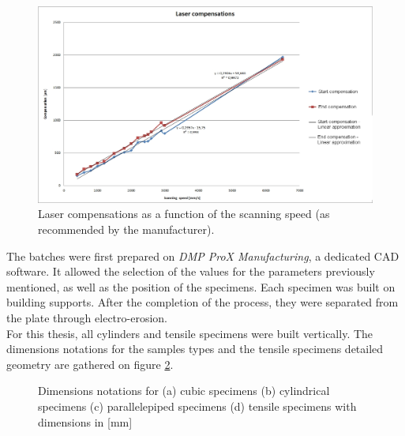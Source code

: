 \begin{figure}[ht]
\centering
\includegraphics[scale=0.45]{Images/Compens1}
\decoRule
\caption[Laser compensations as a function of the scanning speed (as recommended by the manufacturer)]{Laser compensations as a function of the scanning speed (as recommended by the manufacturer).}
\label{fig:Compens1}
\end{figure}

The batches were first prepared on \textit{DMP ProX Manufacturing}, a dedicated CAD software. It allowed the selection of the values for the parameters previously mentioned, as well as the position of the specimens. Each specimen was built on building supports. After the completion of the process, they were separated from the plate through electro-erosion. \\

For this thesis, all cylinders and tensile specimens were built vertically. The dimensions notations for the samples types and the tensile specimens detailed geometry are gathered on figure \ref{fig:cc}.\\

\begin{figure}[ht]
\centering
\noindent{}
\decoRule
\caption[Dimensions notations for (a) cubic specimens (b) cylindrical specimens (c) parallelepiped specimens (d) tensile specimen]{Dimensions notations for (a) cubic specimens (b) cylindrical specimens (c) parallelepiped specimens (d) tensile specimens with dimensions in [mm]}
\label{fig:cc}
\end{figure}


